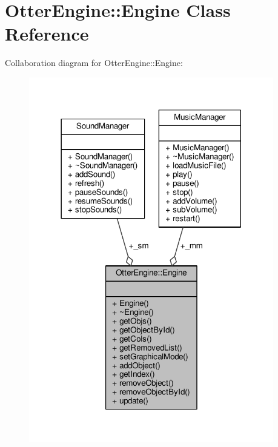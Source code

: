 \hypertarget{class_otter_engine_1_1_engine}{}\section{Otter\+Engine\+:\+:Engine Class Reference}
\label{class_otter_engine_1_1_engine}


Collaboration diagram for Otter\+Engine\+:\+:Engine\+:\nopagebreak
\begin{figure}[H]
\begin{center}
\leavevmode
\includegraphics[width=302pt]{da/da2/class_otter_engine_1_1_engine__coll__graph}
\end{center}
\end{figure}

